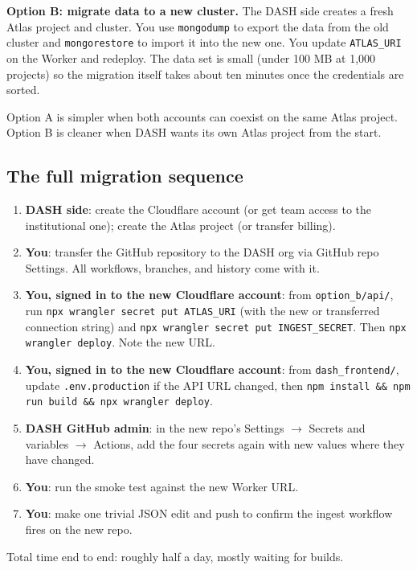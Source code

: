 \documentclass[11pt,a4paper]{article}
\begin{document}
\textbf{Option B: migrate data to a new cluster.} The DASH side creates a fresh Atlas project and cluster. You use \texttt{mongodump} to export the data from the old cluster and \texttt{mongorestore} to import it into the new one. You update \texttt{ATLAS\_URI} on the Worker and redeploy. The data set is small (under 100 MB at 1{,}000 projects) so the migration itself takes about ten minutes once the credentials are sorted.

Option A is simpler when both accounts can coexist on the same Atlas project. Option B is cleaner when DASH wants its own Atlas project from the start.

\subsection{The full migration sequence}

\begin{enumerate}[leftmargin=1.5em,itemsep=4pt]
  \item \textbf{DASH side}: create the Cloudflare account (or get team access to the institutional one); create the Atlas project (or transfer billing).
  \item \textbf{You}: transfer the GitHub repository to the DASH org via GitHub repo Settings. All workflows, branches, and history come with it.
  \item \textbf{You, signed in to the new Cloudflare account}: from \texttt{option\_b/api/}, run \texttt{npx wrangler secret put ATLAS\_URI} (with the new or transferred connection string) and \texttt{npx wrangler secret put INGEST\_SECRET}. Then \texttt{npx wrangler deploy}. Note the new URL.
  \item \textbf{You, signed in to the new Cloudflare account}: from \texttt{dash\_frontend/}, update \texttt{.env.production} if the API URL changed, then \texttt{npm install \&\& npm run build \&\& npx wrangler deploy}.
  \item \textbf{DASH GitHub admin}: in the new repo's Settings \(\rightarrow\) Secrets and variables \(\rightarrow\) Actions, add the four secrets again with new values where they have changed.
  \item \textbf{You}: run the smoke test against the new Worker URL.
  \item \textbf{You}: make one trivial JSON edit and push to confirm the ingest workflow fires on the new repo.
\end{enumerate}

Total time end to end: roughly half a day, mostly waiting for builds.
\end{document}
